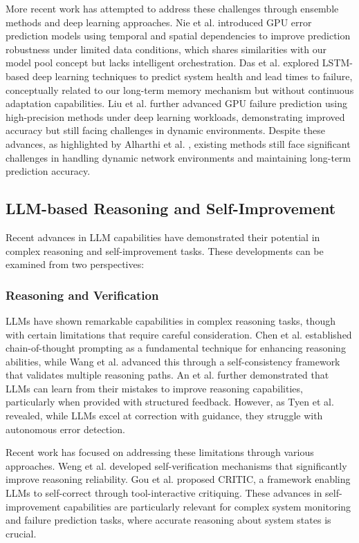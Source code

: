 \documentclass[conference]{IEEEtran}
\begin{document}
More recent work has attempted to address these challenges through ensemble methods and deep learning approaches. Nie et al. \cite{b10} introduced GPU error prediction models using temporal and spatial dependencies to improve prediction robustness under limited data conditions, which shares similarities with our model pool concept but lacks intelligent orchestration. Das et al. \cite{b5} explored LSTM-based deep learning techniques to predict system health and lead times to failure, conceptually related to our long-term memory mechanism but without continuous adaptation capabilities. Liu et al. \cite{b8} further advanced GPU failure prediction using high-precision methods under deep learning workloads, demonstrating improved accuracy but still facing challenges in dynamic environments. Despite these advances, as highlighted by Alharthi et al. \cite{b2}, existing methods still face significant challenges in handling dynamic network environments and maintaining long-term prediction accuracy.

\subsection{LLM-based Reasoning and Self-Improvement}
Recent advances in LLM capabilities have demonstrated their potential in complex reasoning and self-improvement tasks. These developments can be examined from two perspectives:

\subsubsection{Reasoning and Verification}
LLMs have shown remarkable capabilities in complex reasoning tasks, though with certain limitations that require careful consideration. Chen et al. \cite{chen2023} established chain-of-thought prompting as a fundamental technique for enhancing reasoning abilities, while Wang et al. \cite{wang2023} advanced this through a self-consistency framework that validates multiple reasoning paths. An et al. \cite{an2024} further demonstrated that LLMs can learn from their mistakes to improve reasoning capabilities, particularly when provided with structured feedback. However, as Tyen et al. \cite{tyen2023} revealed, while LLMs excel at correction with guidance, they struggle with autonomous error detection.

Recent work has focused on addressing these limitations through various approaches. Weng et al. \cite{weng2023} developed self-verification mechanisms that significantly improve reasoning reliability. Gou et al. \cite{gou2024} proposed CRITIC, a framework enabling LLMs to self-correct through tool-interactive critiquing. These advances in self-improvement capabilities are particularly relevant for complex system monitoring and failure prediction tasks, where accurate reasoning about system states is crucial.
\end{document}
